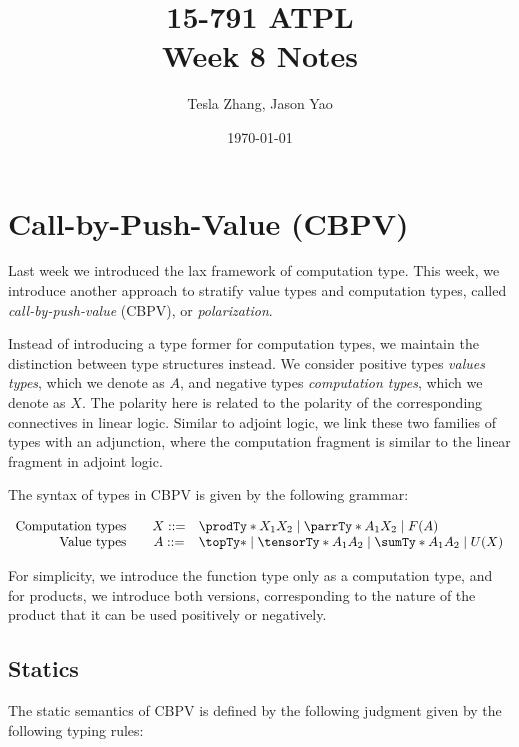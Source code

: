 \documentclass[letterpaper]{article}
\title{15-791 ATPL \\ Week 8 Notes}
\author{Tesla Zhang, Jason Yao}
\date{\today}
\begin{document}
\maketitle

\section{Call-by-Push-Value (CBPV)}
Last week we introduced the lax framework of computation type.
This week, we introduce another approach to stratify value types and computation types,
called \emph{call-by-push-value} (CBPV), or \emph{polarization}.

Instead of introducing a type former for computation types,
we maintain the distinction between type structures instead.
We consider positive types \emph{values types}, which we denote as $A$,
and negative types \emph{computation types}, which we denote as $X$.
The polarity here is related to the polarity of the corresponding connectives in linear logic.
Similar to adjoint logic, we link these two families of types with an adjunction,
where the computation fragment is similar to the linear fragment in adjoint logic.

The syntax of types in CBPV is given by the following grammar:

\[
    \begin{array}{rcl}
        \text{Computation types} \quad & X ::= & \prodTy*{X_1}{X_2} \mid \parrTy*{A_1}{X_2} \mid F(A) \\
        \text{Value types} \quad       & A ::= & \topTy* \mid \tensorTy*{A_1}{A_2} \mid \sumTy*{A_1}{A_2} \mid U(X) \\
    \end{array}
\]

For simplicity, we introduce the function type only as a computation type,
and for products, we introduce both versions, corresponding to the nature of the product that
it can be used positively or negatively.

\subsection{Statics}

The static semantics of CBPV is defined by the following judgment given by the following typing rules:

\begin{mathpar}
\end{mathpar}
\end{document}
